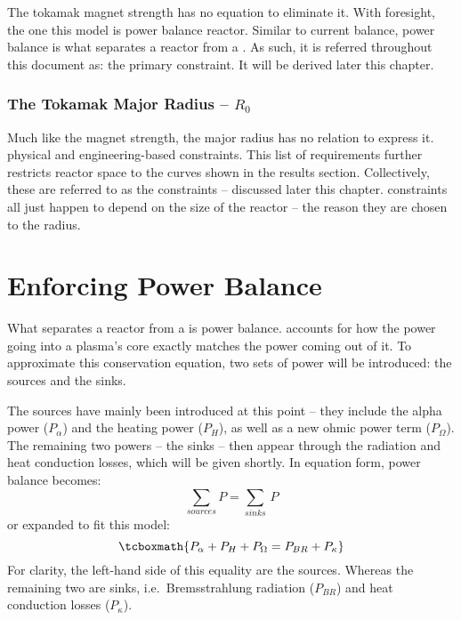 The tokamak magnet strength has no  equation to eliminate it. With foresight, the one this model  is  power balance  reactor. Similar to current balance, power balance is what separates a reactor from a . As such, it is referred throughout this document as: the primary constraint. It will be derived later this chapter.

\subsubsection{The Tokamak Major Radius -- $R_0$}

Much like the magnet strength, the major radius has no  relation to express it.  physical and engineering-based constraints. This list of requirements further restricts reactor space to the curves shown in the results section. Collectively, these are referred to as the  constraints -- discussed later this chapter.  constraints all just happen to depend on the size of the reactor -- the reason they are chosen to  the radius.

\section{Enforcing Power Balance}

What separates a reactor from a  is power balance.  accounts for how the power going into a plasma's core exactly matches the power coming out of it. To approximate this conservation equation, two sets of power will be introduced: the sources and the sinks.

The sources have mainly been introduced at this point -- they include the alpha power ($P_\alpha$)  and the heating power ($P_H$), as well as a new ohmic power term ($P_\Omega$). The remaining two powers -- the sinks -- then appear through the radiation and heat conduction losses, which will be given shortly. In equation form, power balance becomes:
\begin{equation}
	\sum_{sources} P = \sum_{sinks} \, P
\end{equation}
or expanded to fit this model:
\begin{equation}
	\label{eq:power_balance}
	\tcboxmath{
	P_\alpha + P_H + P_\Omega = P_{BR} + P_\kappa
	}
\end{equation}
For clarity, the left-hand side of this equality are the sources. Whereas the remaining two are sinks, i.e.\ Bremsstrahlung radiation ($P_{BR}$) and heat conduction losses ($P_\kappa$).

